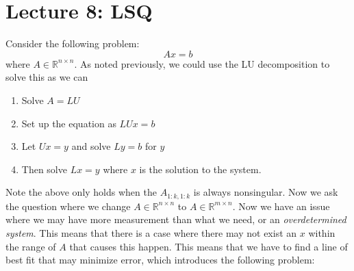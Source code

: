 \documentclass[11pt]{article}
\theoremstyle{definition}
\newcommand{\R}{\mathbb{R}}
\begin{document}
\section{Lecture 8: LSQ}
Consider the following problem:
\[
Ax = b
\]
where $A \in \R^{n \times n}$. As noted previously, we could use the LU decomposition to solve this as we can 
\begin{enumerate}
  \item Solve $A = LU$
  \item Set up the equation as $LU x = b$
  \item Let $Ux = y$ and solve $Ly = b$ for $y$
  \item Then solve $Lx = y$ where $x$ is the solution to the system. 
\end{enumerate}
Note the above only holds when the $A_{1:k, 1:k}$ is always nonsingular. Now we ask the question where we change $A \in \R^{n \times n}$ to $A \in \R^{m \times n}$. Now we have an issue where we may have more measurement than what we need, or an \emph{overdetermined system}. This means that there is a case where there may not exist an $x$ within the range of $A$ that causes this happen. This means that we have to find a line of best fit that may minimize error, which introduces the following problem:
\end{document}
